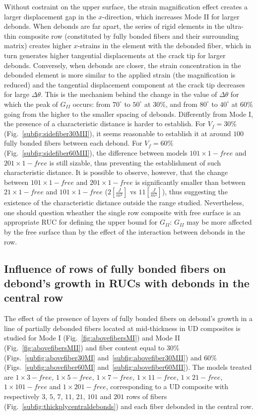 \documentclass[review]{elsarticle}
\begin{document}
Without costraint on the upper surface, the strain magnification effect creates a larger displacement gap in the $x$-direction, which increases Mode II for larger debonds. When debonds are far apart, the series of rigid elements in the ultra-thin composite row (constituted by fully bonded fibers and their surrounding matrix) creates higher $x$-strains in the element with the debonded fiber, which in turn generates higher tangential displacements at the crack tip for larger debonds. Conversely, when debonds are closer, the strain concentration in the debonded element is more similar to the applied strain (the magnification is reduced) and the tangential displacement component at the crack tip decreases for large $\Delta\theta$. This is the mechanism behind the change in the value of $\Delta\theta$ for which the peak of $G_{II}$ occurs: from $70^{\circ}$ to $50^{\circ}$ at $30\%$, and from $80^{\circ}$ to $40^{\circ}$ at $60\%$ going from the higher to the smaller spacing of debonds. Differently from Mode I, the presence of a characteristic distance is harder to establish. For $V_{f}=30\%$ (Fig.~\ref{subfig:sidefiber30MII}), it seems reasonable to establish it at around $100$ fully bonded fibers between each debond. For $V_{f}=60\%$ (Fig.~\ref{subfig:sidefiber60MII}), the difference between models $101\times 1-free$ and $201\times 1-free$ is still sizable, thus preventing the establishment of such characteristic distance. It is possible to observe, however, that the change between $101\times 1-free$ and $201\times 1-free$ is significantly smaller than between $21\times 1-free$ and $101\times 1-free$ ($2\left[\frac{J}{m^{2}}\right]$ vs $11\left[\frac{J}{m^{2}}\right]$), thus suggesting the existence of the characteristic distance outside the range studied. Nevertheless, one should question wheather the single row composite with free surface is an appropriate RUC for defining the upper bound for $G_{II}$: $G_{II}$ may be more affected by the free surface than by the effect of the interaction between debonds in the row.

\subsection{Influence of rows of fully bonded fibers on debond's growth in RUCs with debonds in the central row}

The effect of the presence of layers of fully bonded fibers on debond's growth in a line of partially debonded fibers located at mid-thickness in UD composites is studied for Mode I (Fig.~\ref{fig:abovefibersMI}) and Mode II (Fig.~\ref{fig:abovefibersMII}) and fiber content equal to $30\%$ (Figs.~\ref{subfig:abovefiber30MI} and~\ref{subfig:abovefiber30MII}) and $60\%$ (Figs.~\ref{subfig:abovefiber60MI} and~\ref{subfig:abovefiber60MII}). The models treated are $1\times 3-free$, $1\times 5-free$, $1\times 7-free$, $1\times 11-free$, $1\times 21-free$, $1\times 101-free$ and $1\times 201-free$, corresponding to a UD composite with respectively $3$, $5$, $7$, $11$, $21$, $101$ and $201$ rows of fibers (Fig.~\ref{subfig:thickplycentraldebonds}) and each fiber debonded in the central row.
\end{document}
